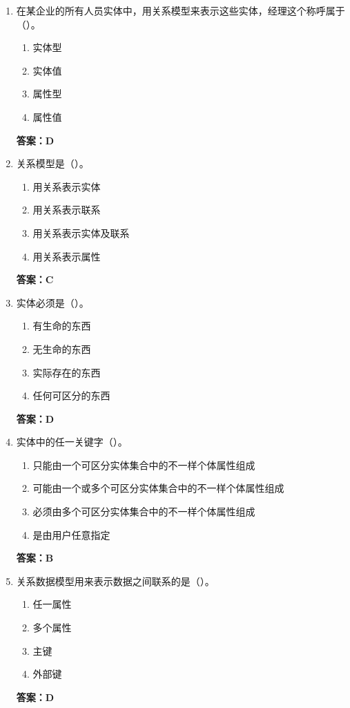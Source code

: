 \documentclass[12pt, a4paper]{article}
\begin{document}
\begin{enumerate}[label=\arabic*.]
	\item 在某企业的所有人员实体中，用关系模型来表示这些实体，经理这个称呼属于（\quad）。
	      \begin{enumerate}
		      \item 实体型
		      \item 实体值
		      \item 属性型
		      \item 属性值
	      \end{enumerate}
	      \textbf{答案：D}

	\item 关系模型是（\quad）。
	      \begin{enumerate}
		      \item 用关系表示实体
		      \item 用关系表示联系
		      \item 用关系表示实体及联系
		      \item 用关系表示属性
	      \end{enumerate}
	      \textbf{答案：C}

	\item 实体必须是（\quad）。
	      \begin{enumerate}
		      \item 有生命的东西
		      \item 无生命的东西
		      \item 实际存在的东西
		      \item 任何可区分的东西
	      \end{enumerate}
	      \textbf{答案：D}

	\item 实体中的任一关键字（\quad）。
	      \begin{enumerate}
		      \item 只能由一个可区分实体集合中的不一样个体属性组成
		      \item 可能由一个或多个可区分实体集合中的不一样个体属性组成
		      \item 必须由多个可区分实体集合中的不一样个体属性组成
		      \item 是由用户任意指定
	      \end{enumerate}
	      \textbf{答案：B}

	\item 关系数据模型用来表示数据之间联系的是（\quad）。
	      \begin{enumerate}
		      \item 任一属性
		      \item 多个属性
		      \item 主键
		      \item 外部键
	      \end{enumerate}
	      \textbf{答案：D}


\end{enumerate}
\end{document}
